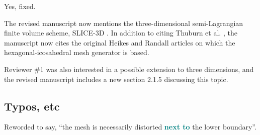 \documentclass[times]{elsarticle}
\newcommand{\revtwo}[1]{\textcolor{teal}{\textbf{#1}}}
\begin{document}
\begin{quotation}
\begin{comment}
\item P9, last sentence of section 2.1. Should $w_d$ be $m_d$?
\end{comment}
\end{quotation}
Yes, fixed.

\begin{quotation}
\begin{comment}
\item The discussion of previous work is generally very good. On p2 is it worth mentioning
the SLICE scheme of Zerroukat and co-authors? In the first paragraph of section 3.3, credit
for the hexagonal-icosahedral mesh should probably be given to Heikes and Randall.
\end{comment}
\end{quotation}
The revised manuscript now mentions the three-dimensional semi-Lagrangian finite volume scheme, SLICE-3D \citep{zerroukat-allen2012}.
In addition to citing Thuburn et al. \citep{thuburn2014}, the manuscript now cites the original Heikes and Randall articles \citep{heikes-randall1995a,heikes-randall1995b} on which the hexagonal-icosahedral mesh generator is based.

\begin{quotation}
\begin{comment}
\item Some brief comments on how the approach extends to three dimensions would be
appropriate.
\end{comment}
\end{quotation}
Reviewer \#1 was also interested in a possible extension to three dimensions, and the revised manuscript includes a new section 2.1.5 discussing this topic.

\subsection*{Typos, etc}

\begin{quotation}
\begin{comment}
\item Introduction, second sentence: `modification of the lower boundary' is an odd way to
think of it.
\end{comment}
\end{quotation}
Reworded to say, ``the mesh is necessarily distorted \revtwo{next to} the lower boundary''.
\end{document}
